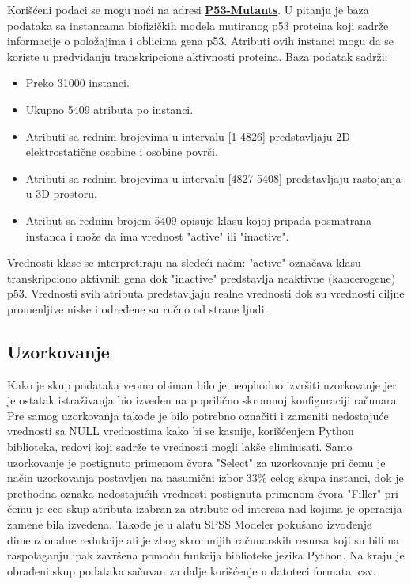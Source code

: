\documentclass[12pt]{article}
\begin{document}
Korišćeni podaci se mogu naći na adresi \href{https://archive.ics.uci.edu/ml/datasets/p53+Mutants}{\bf P53-Mutants}. U pitanju je baza podataka sa instancama biofizičkih modela mutiranog p53 proteina koji sadrže informacije o položajima i oblicima gena p53. Atributi ovih instanci mogu da se koriste u predviđanju transkripcione aktivnosti proteina. Baza podatak sadrži:

\begin{itemize}
\item Preko 31000 instanci.
\item Ukupno 5409 atributa po instanci.
\item Atributi sa rednim brojevima u intervalu [1-4826] predstavljaju 2D elektrostatične osobine i osobine površi.
\item Atributi sa rednim brojevima u intervalu [4827-5408] predstavljaju rastojanja u 3D prostoru.
\item Atribut sa rednim brojem 5409 opisuje klasu kojoj pripada posmatrana instanca i može da ima vrednost "active" ili "inactive".
\end{itemize}

Vrednosti klase se interpretiraju na sledeći način: "active" označava klasu transkripciono aktivnih gena dok "inactive" predstavlja neaktivne (kancerogene) p53. Vrednosti svih atributa predstavljaju realne vrednosti dok su vrednosti ciljne promenljive niske i određene su ručno od strane ljudi.

\subsection {Uzorkovanje}

Kako je skup podataka veoma obiman bilo je neophodno izvršiti uzorkovanje jer je ostatak istraživanja bio izveden na poprilično skromnoj konfiguraciji računara. Pre samog uzorkovanja takođe je bilo potrebno označiti i zameniti nedostajuće vrednosti sa NULL vrednostima kako bi se kasnije, korišćenjem Python biblioteka, redovi koji sadrže te vrednosti mogli lakše eliminisati. Samo uzorkovanje je postignuto primenom čvora "Select" za uzorkovanje pri čemu je način uzorkovanja postavljen na nasumični izbor 33\% celog skupa instanci, dok je prethodna oznaka nedostajućih vrednosti postignuta primenom čvora "Filler" pri čemu je ceo skup atributa izabran za atribute od interesa nad kojima je operacija zamene bila izvedena. Takođe je u alatu SPSS Modeler pokušano izvođenje dimenzionalne redukcije ali je zbog skromnijih računarskih resursa koji su bili na raspolaganju ipak završena pomoću funkcija biblioteke jezika Python. Na kraju je obrađeni skup podataka sačuvan za dalje korišćenje u datoteci formata .csv.
\end{document}
